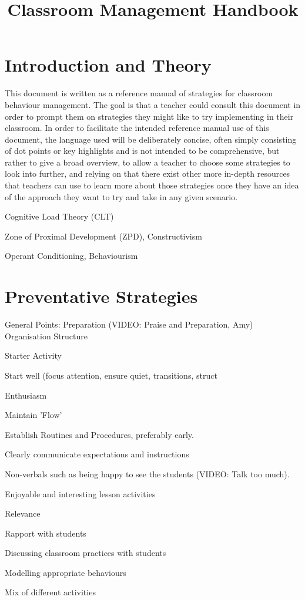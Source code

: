 \documentclass{report}
\title{Classroom Management Handbook}
\begin{document}
\chapter{Introduction and Theory}

This document is written as a reference manual of strategies for classroom behaviour management. The goal is that a teacher could consult this document in order to prompt them on strategies they might like to try implementing in their classroom. In order to facilitate the intended reference manual use of this document, the language used will be deliberately concise, often simply consisting of dot points or key highlights and is not intended to be comprehensive, but rather to give a broad overview, to allow a teacher to choose some strategies to look into further, and relying on that there exist other more in-depth resources that teachers can use to learn more about those strategies once they have an idea of the approach they want to try and take in any given scenario.

Cognitive Load Theory (CLT)

Zone of Proximal Development (ZPD), Constructivism

Operant Conditioning, Behaviourism


\chapter{Preventative Strategies}

General Points:
Preparation (VIDEO: Praise and Preparation, Amy)
Organisation
Structure

Starter Activity

Start well (focus attention, ensure quiet, transitions, struct

Enthusiasm

Maintain 'Flow'

Establish Routines and Procedures, preferably early.

Clearly communicate expectations and instructions

Non-verbals such as being happy to see the students (VIDEO: Talk too much).

Enjoyable and interesting lesson activities

Relevance

Rapport with students

Discussing classroom practices with students

Modelling appropriate behaviours

Mix of different activities
\end{document}
